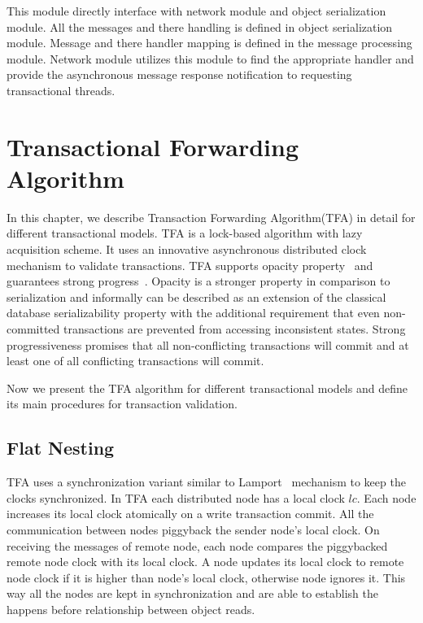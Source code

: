 \documentclass[12pt,english]{report}
\begin{document}
This module directly interface with network module and object serialization module. All the messages and there handling is defined in object serialization module. Message and there handler mapping is defined in the message processing module. Network module utilizes this module to find the appropriate handler and provide the asynchronous message response notification to requesting transactional threads.

\chapter{Transactional Forwarding Algorithm}\label{chap:algorithm}

In this chapter, we describe Transaction Forwarding Algorithm(TFA) in detail for different transactional models. TFA is a lock-based algorithm with lazy acquisition scheme. It uses an innovative asynchronous distributed clock mechanism to validate transactions. TFA supports opacity property~\cite{guerraoui2009semantics} and guarantees strong progress~\cite{guerraoui2009semantics}. Opacity is a stronger property in comparison to serialization and informally can be described as an extension of the classical database serializability property with the additional requirement that even non-committed transactions are prevented from accessing inconsistent states. Strong progressiveness promises that all non-conflicting transactions will commit and at least one of all conflicting transactions will commit.
 
Now we present the TFA algorithm for different transactional models and define its main procedures for transaction validation.
 
\section{Flat Nesting}
TFA uses a synchronization variant similar to Lamport~\cite{lamport1978time} mechanism to keep the clocks synchronized. In TFA each distributed node has a local clock $lc$. Each node increases its local clock atomically on a write transaction commit. All the communication between nodes piggyback the sender node's local clock. On receiving the messages of remote node, each node compares the piggybacked remote node clock with its local clock. A node updates its local clock to remote node clock if it is higher than node's local clock, otherwise node ignores it. This way all the nodes are kept in synchronization and are able to establish the happens before relationship between object reads.
\end{document}
